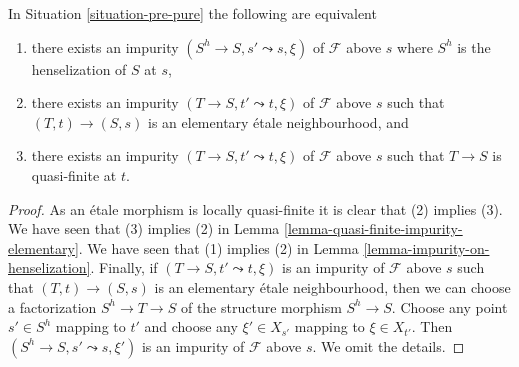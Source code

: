 \begin{lemma}
\label{lemma-pure-along-X-s}
In Situation \ref{situation-pre-pure} the following
are equivalent
\begin{enumerate}
\item there exists an impurity $(S^h \to S, s' \leadsto s, \xi)$
of $\mathcal{F}$ above $s$ where $S^h$ is the henselization of $S$ at $s$,
\item there exists an impurity $(T \to S, t' \leadsto t, \xi)$
of $\mathcal{F}$ above $s$ such that $(T, t) \to (S, s)$ is an
elementary \'etale neighbourhood, and
\item there exists an impurity $(T \to S, t' \leadsto t, \xi)$
of $\mathcal{F}$ above $s$ such that $T \to S$ is quasi-finite at $t$.
\end{enumerate}
\end{lemma}

\begin{proof}
As an \'etale morphism is locally quasi-finite it is clear that
(2) implies (3). We have seen that (3) implies (2) in
Lemma \ref{lemma-quasi-finite-impurity-elementary}.
We have seen that (1) implies (2) in
Lemma \ref{lemma-impurity-on-henselization}.
Finally, if $(T \to S, t' \leadsto t, \xi)$ is an impurity
of $\mathcal{F}$ above $s$ such that $(T, t) \to (S, s)$ is an
elementary \'etale neighbourhood, then we can choose a factorization
$S^h \to T \to S$ of the structure morphism $S^h \to S$.
Choose any point $s' \in S^h$ mapping to $t'$ and choose any
$\xi' \in X_{s'}$ mapping to $\xi \in X_{t'}$. Then
$(S^h \to S, s' \leadsto s, \xi')$ is an impurity of
$\mathcal{F}$ above $s$. We omit the details.
\end{proof}
